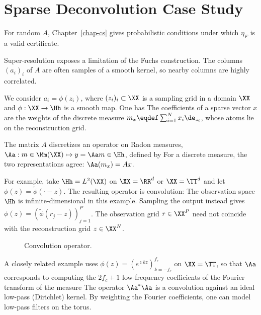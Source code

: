\section{Sparse Deconvolution Case Study}

For random $A$, Chapter~\ref{chap-cs} gives probabilistic conditions under which $\eta_F$ is a valid certificate.

Super-resolution exposes a limitation of the Fuchs construction. The columns $(a_i)_i$ of $A$ are often samples of a smooth kernel, so nearby columns are highly correlated.

We consider $a_i=\phi(z_i)$, where $(z_i)_i \subset \XX$ is a sampling grid in a domain $\XX$ and $\phi : \XX \rightarrow \Hh$ is a smooth map. One has
The coefficients of a sparse vector $x$ are the weights of the discrete measure $m_{x} \eqdef \sum_{i=1}^N x_i \de_{z_i}$, whose atoms lie on the reconstruction grid.


The matrix $A$ discretizes an operator on Radon measures, $\Aa : m \in \Mm(\XX) \mapsto y = \Aa m \in \Hh$, defined by
For a discrete measure, the two representations agree: $\Aa(m_x)=A x$.

For example, take $\Hh=L^2(\XX)$ on $\XX=\RR^d$ or $\XX=\TT^d$ and let $\phi(z) = \tilde\phi(\cdot-z)$. The resulting operator is convolution:
The observation space $\Hh$ is infinite-dimensional in this example. Sampling the output instead gives $\phi(z) = (\tilde\phi(r_j-z))_{j=1}^P$. The observation grid $r \in \XX^P$ need not coincide with the reconstruction grid $z \in \XX^N$.




\begin{figure}[tbp]
\centering
{}
\caption{Convolution operator.}
\label{fig-spikes}
\end{figure}



A closely related example uses $\phi(z)=(e^{\imath k z})_{k=-f_c}^{f_c}$ on $\XX=\TT$, so that $\Aa$ corresponds to computing the $2f_c+1$ low-frequency coefficients of the Fourier transform of the measure
The operator $\Aa^*\Aa$ is a convolution against an ideal low-pass (Dirichlet) kernel. By weighting the Fourier coefficients, one can model low-pass filters on the torus.

